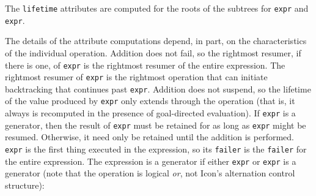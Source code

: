 

\begin{center}
\end{center}

\noindent
The \texttt{lifetime} attributes are computed for the roots of the
subtrees for \texttt{expr} and
\texttt{expr}.


The details of the attribute computations depend, in part, on the
characteristics of the individual operation. Addition does not fail,
so the rightmost resumer, if there is one, of
\texttt{expr} is the rightmost resumer of the entire
expression. The rightmost resumer of \texttt{expr} is
the rightmost operation that can initiate backtracking that continues
past \texttt{expr}. Addition does not suspend, so the
lifetime of the value produced by \texttt{expr} only
extends through the operation (that is, it always is recomputed in the
presence of goal-directed evaluation). If
\texttt{expr} is a generator, then the result of
\texttt{expr} must be retained for as long as
\texttt{expr} might be resumed. Otherwise, it need
only be retained until the addition is
performed. \texttt{expr} is the first thing executed
in the expression, so its \texttt{failer} is the \texttt{failer} for
the entire expression. The expression is a generator if either
\texttt{expr} or \texttt{expr} is a
generator (note that the operation {\textbar} is logical \textit{or},
not Icon's alternation control structure):

